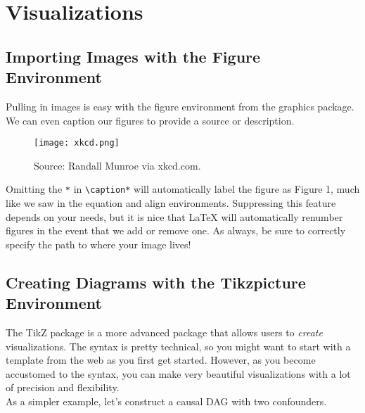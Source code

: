 \documentclass[12pt]{article}	%
\begin{document}

\newpage
\section{Visualizations}

\subsection{Importing Images with the Figure Environment}

Pulling in images is easy with the figure environment from the graphics package. We can even caption our figures to provide a source or description.

	\begin{figure}[h]
		\centering
 		\texttt{[image: xkcd.png]}
		\caption*{Source: Randall Munroe via xkcd.com.}
	\end{figure}

\noindent Omitting the \verb!*! in \verb!\caption*! will automatically label the figure as Figure 1, much like we saw in the equation and align environments. Suppressing this feature depends on your needs, but it is nice that \LaTeX{} will automatically renumber figures in the event that we add or remove one. As always, be sure to correctly specify the path to where your image lives!

\subsection{Creating Diagrams with the Tikzpicture Environment}

The TikZ package is a more advanced package that allows users to {\it create} visualizations. The syntax is pretty technical, so you might want to start with a template from the web as you first get started. However, as you become accustomed to the syntax, you can make very beautiful visualizations with a lot of precision and flexibility.  \\

As a simpler example, let's construct a causal DAG with two confounders.

	\begin{center}
	\end{center}
\end{document}
